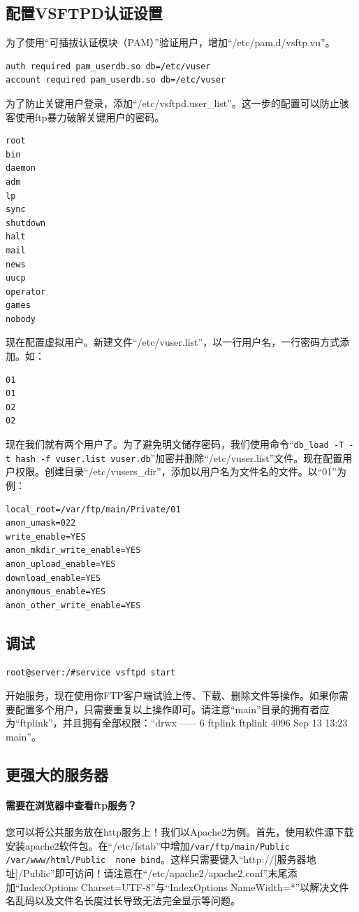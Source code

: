 \subsection{配置VSFTPD认证设置}
为了使用“可插拔认证模块（PAM）”验证用户，增加“/etc/pam.d/vsftp.vu”。
\begin{verbatim}
auth required pam_userdb.so db=/etc/vuser
account required pam_userdb.so db=/etc/vuser
\end{verbatim}
为了防止关键用户登录，添加“/etc/vsftpd.user\_list”。这一步的配置可以防止骇客使用ftp暴力破解关键用户的密码。
\begin{verbatim}
root
bin
daemon
adm
lp
sync
shutdown
halt
mail
news
uucp
operator
games
nobody
\end{verbatim}\par
现在配置虚拟用户。新建文件“/etc/vuser.list”，以一行用户名，一行密码方式添加。如：
\begin{verbatim}
01
01
02
02
\end{verbatim}\par
现在我们就有两个用户了。为了避免明文储存密码，我们使用命令“\verb|db_load -T -t hash -f vuser.list vuser.db|”加密并删除“/etc/vuser.list”文件。现在配置用户权限。创建目录“/etc/vusers\_dir”，添加以用户名为文件名的文件。以“01”为例：
\begin{verbatim}
local_root=/var/ftp/main/Private/01
anon_umask=022
write_enable=YES
anon_mkdir_write_enable=YES
anon_upload_enable=YES
download_enable=YES
anonymous_enable=YES
anon_other_write_enable=YES
\end{verbatim}
\subsection{调试}
\begin{verbatim}
root@server:/#service vsftpd start
\end{verbatim}\par
开始服务，现在使用你FTP客户端试验上传、下载、删除文件等操作。如果你需要配置多个用户，只需要重复以上操作即可。请注意“main”目录的拥有者应为“ftplink”，并且拥有全部权限：“drwx------  6 ftplink ftplink 4096 Sep 13 13:23 main”。
\subsection{更强大的服务器}
\paragraph{需要在浏览器中查看ftp服务？}您可以将公共服务放在http服务上！我们以Apache2为例。首先，使用软件源下载安装apache2软件包。在“/etc/fstab”中增加\verb|/var/ftp/main/Public /var/www/html/Public  none bind|。这样只需要键入“http://[服务器地址]/Public”即可访问！请注意在“/etc/apache2/apache2.conf”末尾添加“IndexOptions Charset=UTF-8”与“IndexOptions NameWidth=*”以解决文件名乱码以及文件名长度过长导致无法完全显示等问题。
